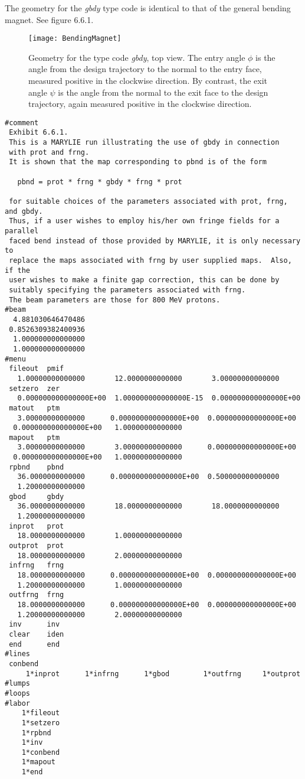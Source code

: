          The geometry for the {\em gbdy} type code is identical to that of the general
bending magnet.  See figure 6.6.1.


\begin{figure}[hp]
  \centering
  \texttt{[image: BendingMagnet]}
  \caption{Geometry for the type code {\em gbdy}, top view.  The entry angle $\phi$ is the angle from the design trajectory to the normal to the entry face, measured positive in the clockwise direction.  By contrast, the exit angle $\psi$ is the angle from the normal to the exit face to the design trajectory, again measured positive in the clockwise direction.}
\end{figure}
\clearpage


\begin{footnotesize}
\begin{verbatim}
#comment
 Exhibit 6.6.1.
 This is a MARYLIE run illustrating the use of gbdy in connection
 with prot and frng.
 It is shown that the map corresponding to pbnd is of the form

   pbnd = prot * frng * gbdy * frng * prot

 for suitable choices of the parameters associated with prot, frng, and gbdy.
 Thus, if a user wishes to employ his/her own fringe fields for a parallel
 faced bend instead of those provided by MARYLIE, it is only necessary to
 replace the maps associated with frng by user supplied maps.  Also, if the
 user wishes to make a finite gap correction, this can be done by
 suitably specifying the parameters associated with frng.
 The beam parameters are those for 800 MeV protons.
#beam
  4.881030646470486
 0.8526309382400936
  1.000000000000000
  1.000000000000000
#menu
 fileout  pmif
   1.00000000000000       12.0000000000000       3.00000000000000
 setzero  zer
   0.000000000000000E+00  1.000000000000000E-15  0.000000000000000E+00
 matout   ptm
   3.00000000000000      0.000000000000000E+00  0.000000000000000E+00
  0.000000000000000E+00   1.00000000000000
 mapout   ptm
   3.00000000000000       3.00000000000000      0.000000000000000E+00
  0.000000000000000E+00   1.00000000000000
 rpbnd    pbnd
   36.0000000000000      0.000000000000000E+00  0.500000000000000
   1.20000000000000
 gbod     gbdy
   36.0000000000000       18.0000000000000       18.0000000000000
   1.20000000000000
 inprot   prot
   18.0000000000000       1.00000000000000
 outprot  prot
   18.0000000000000       2.00000000000000
 infrng   frng
   18.0000000000000      0.000000000000000E+00  0.000000000000000E+00
   1.20000000000000       1.00000000000000
 outfrng  frng
   18.0000000000000      0.000000000000000E+00  0.000000000000000E+00
   1.20000000000000       2.00000000000000
 inv      inv
 clear    iden
 end      end
#lines
 conbend
     1*inprot      1*infrng      1*gbod        1*outfrng     1*outprot
#lumps
#loops
#labor
    1*fileout
    1*setzero
    1*rpbnd
    1*inv
    1*conbend
    1*mapout
    1*end


\end{verbatim}
\end{footnotesize}
